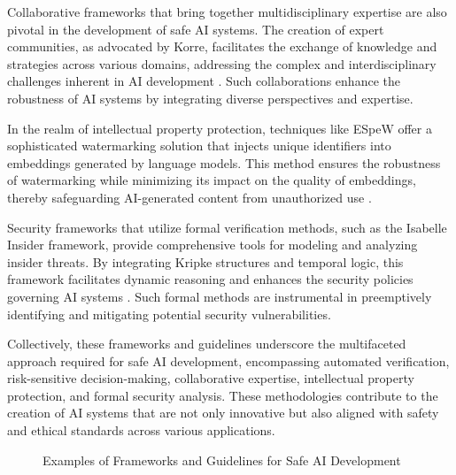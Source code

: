 Collaborative frameworks that bring together multidisciplinary expertise are also pivotal in the development of safe AI systems. The creation of expert communities, as advocated by Korre, facilitates the exchange of knowledge and strategies across various domains, addressing the complex and interdisciplinary challenges inherent in AI development \cite{korre2023takesvillagemultidisciplinaritycollaboration}. Such collaborations enhance the robustness of AI systems by integrating diverse perspectives and expertise.



In the realm of intellectual property protection, techniques like ESpeW offer a sophisticated watermarking solution that injects unique identifiers into embeddings generated by language models. This method ensures the robustness of watermarking while minimizing its impact on the quality of embeddings, thereby safeguarding AI-generated content from unauthorized use \cite{wang2024espewrobustcopyrightprotection}.



Security frameworks that utilize formal verification methods, such as the Isabelle Insider framework, provide comprehensive tools for modeling and analyzing insider threats. By integrating Kripke structures and temporal logic, this framework facilitates dynamic reasoning and enhances the security policies governing AI systems \cite{kammller2020applyingisabelleinsiderframework}. Such formal methods are instrumental in preemptively identifying and mitigating potential security vulnerabilities.



Collectively, these frameworks and guidelines underscore the multifaceted approach required for safe AI development, encompassing automated verification, risk-sensitive decision-making, collaborative expertise, intellectual property protection, and formal security analysis. These methodologies contribute to the creation of AI systems that are not only innovative but also aligned with safety and ethical standards across various applications.






{
\begin{figure}[ht!]
\centering
{}\hspace{0.03\textwidth}
\hspace{0.03\textwidth}
\caption{Examples of Frameworks and Guidelines for Safe AI Development}\label{fig:retrieve_fig_1}
\end{figure}
}


